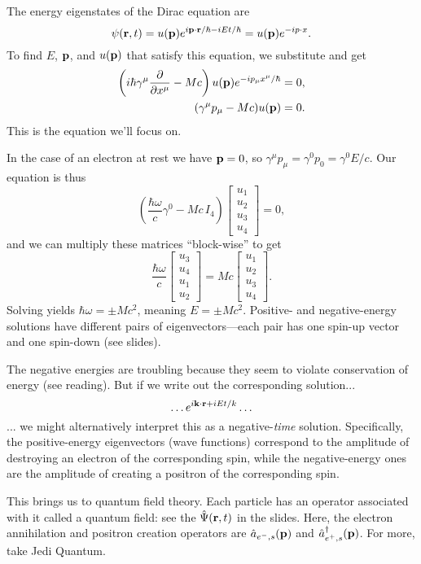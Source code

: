 \documentclass[../p164main.tex]{subfiles}
\begin{document}
The energy eigenstates of the Dirac equation are
\[ \psi(\mathbf{r}, t) = u(\mathbf{p}) e^{i \mathbf{p} \cdot \mathbf{r} / \hbar - iEt / \hbar} = u(\mathbf{p}) e^{-ip \cdot x}. \]
To find $E$, $\mathbf{p}$, and $u(\mathbf{p})$ that satisfy this equation, we substitute and get
\begin{align*}
    \left( i\hbar \gamma^\mu \frac{\partial}{\partial x^\mu} - Mc \right) u(\mathbf{p}) e^{-i p_\mu x^\mu / \hbar} &= 0, \\
    (\gamma^\mu p_\mu - Mc) u(\mathbf{p}) &= 0.
\end{align*}
This is the equation we'll focus on.

In the case of an electron at rest we have $\mathbf{p} = 0$, so $\gamma^\mu p_\mu = \gamma^0 p_0 = \gamma^0 E / c$.
Our equation is thus
\[ \left( \frac{\hbar \omega}{c} \gamma^0 - Mc \mathbb \,I_{4} \right) \begin{bmatrix} u_1 \\ u_2 \\ u_3 \\ u_4 \end{bmatrix} = 0, \]
and we can multiply these matrices ``block-wise'' to get
\[ \frac{\hbar \omega}{c} \begin{bmatrix} u_3 \\ u_4 \\ u_1 \\ u_2 \end{bmatrix} = Mc \begin{bmatrix} u_1 \\ u_2 \\ u_3 \\ u_4 \end{bmatrix}. \]
Solving yields $\hbar \omega = \pm M c^2$, meaning $E = \pm Mc^2$.
Positive- and negative-energy solutions have different pairs of eigenvectors---each pair has one spin-up vector and one spin-down (see slides).

The negative energies are troubling because they seem to violate conservation of energy (see reading).
But if we write out the corresponding solution...
\[ \ldots e^{i \mathbf{k} \cdot \mathbf{r} + iEt / k}\ldots \]
... we might alternatively interpret this as a negative-\textit{time} solution.
Specifically, the positive-energy eigenvectors (wave functions) correspond to the amplitude of destroying an electron of the corresponding spin, while the negative-energy ones are the amplitude of creating a positron of the corresponding spin.

This brings us to quantum field theory.
Each particle has an operator associated with it called a quantum field: see the $\hat \Psi(\mathbf{r},t)$ in the slides.
Here, the electron annihilation and positron creation operators are $\hat a_{e^-, s}(\mathbf{p})$ and $\hat a_{e^+, s}^\dagger(\mathbf{p})$.
For more, take Jedi Quantum.
\end{document}
